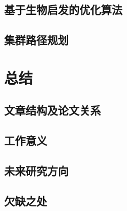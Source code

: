 \documentclass[conference]{IEEEtran}
\begin{document}
\subsection{基于生物启发的优化算法}%



\subsection{集群路径规划}%




\section{总结}%



\subsection{文章结构及论文关系}%



\subsection{工作意义}%



\subsection{未来研究方向}%



\subsection{欠缺之处}%




\end{document}
